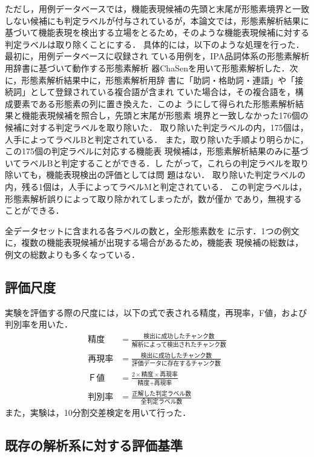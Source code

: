 \documentclass[japanese]{jnlp_1.2d}
\newcommand{\tabref}[1]{}
\begin{document}
ただし，用例データベースでは，機能表現候補の先頭と末尾が形態素境界と一致
しない候補にも判定ラベルが付与されているが，本論文では，形態素解析結果に
基づいて機能表現を検出する立場をとるため，そのような機能表現候補に対する
判定ラベルは取り除くことにする．
具体的には，以下のような処理を行った．最初に，用例データベースに収録され
ている用例を，IPA品詞体系の形態素解析用辞書に基づいて動作する形態素解析
器ChaSenを用いて形態素解析した．次に，形態素解析結果中に，形態素解析用辞
書に「助詞・格助詞・連語」や「接続詞」として登録されている複合語が含まれ
ていた場合は，その複合語を，構成要素である形態素の列に置き換えた．このよ
うにして得られた形態素解析結果と機能表現候補を照合し，先頭と末尾が形態素
境界と一致しなかった176個の候補に対する判定ラベルを取り除いた．
取り除いた判定ラベルの内，175個は，人手によってラベルBと判定されている．
また，取り除いた手順より明らかに，この175個の判定ラベルに対応する機能表
現候補は，形態素解析結果のみに基づいてラベルBと判定することができる．し
たがって，これらの判定ラベルを取り除いても，機能表現検出の評価としては問
題はない．
取り除いた判定ラベルの内，残る1個は，人手によってラベルMと判定されている．
この判定ラベルは，形態素解析誤りによって取り除かれてしまったが，数が僅か
であり，無視することができる．

全データセットに含まれる各ラベルの数と，全形態素数を\tabref{tab:dataset}
に示す．1つの例文に，複数の機能表現候補が出現する場合があるため，機能表
現候補の総数は，例文の総数よりも多くなっている．

\subsection{評価尺度}
\label{subsec:評価尺度}

実験を評価する際の尺度には，以下の式で表される精度，再現率，F値，および
判別率を用いた．
\begin{align*} 
  \mbox{精度} &= \frac{\mbox{検出に成功したチャンク数}}{\mbox{解析によって検出されたチャンク数}} 
\\[0.5zh]
  \mbox{再現率} &= \frac{\mbox{検出に成功したチャンク数}}{\mbox{評価データに存在するチャンク数}} 
\\[0.5zh]
  \mbox{Ｆ値} &= \frac{2 \times \mbox{精度} \times \mbox{再現率}}{\mbox{精度} + \mbox{再現率}} 
\\[0.5zh]
  \mbox{判別率} &= \frac{\mbox{正解した判定ラベル数}}{\mbox{全判定ラベル数}} 
\end{align*}
また，実験は，10分割交差検定を用いて行った．

\subsection{既存の解析系に対する評価基準}
\label{subsec:既存の解析系}
\end{document}
